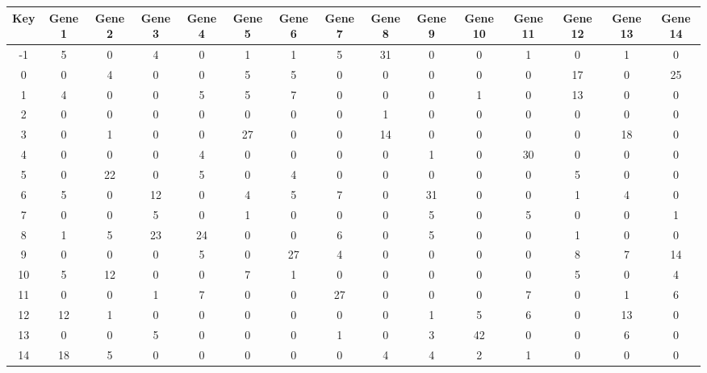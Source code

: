 \begin{tabular}{|c|c|c|c|c|c|c|c|c|c|c|c|c|c|c|}
\hline
Key & Gene 1 & Gene 2 & Gene 3 & Gene 4 & Gene 5 & Gene 6 & Gene 7 & Gene 8 & Gene 9 & Gene 10 & Gene 11 & Gene 12 & Gene 13 & Gene 14 \\
\hline
-1 & 5 & 0 & 4 & 0 & 1 & 1 & 5 & 31 & 0 & 0 & 1 & 0 & 1 & 0 \\
0 & 0 & 4 & 0 & 0 & 5 & 5 & 0 & 0 & 0 & 0 & 0 & 17 & 0 & 25 \\
1 & 4 & 0 & 0 & 5 & 5 & 7 & 0 & 0 & 0 & 1 & 0 & 13 & 0 & 0 \\
2 & 0 & 0 & 0 & 0 & 0 & 0 & 0 & 1 & 0 & 0 & 0 & 0 & 0 & 0 \\
3 & 0 & 1 & 0 & 0 & 27 & 0 & 0 & 14 & 0 & 0 & 0 & 0 & 18 & 0 \\
4 & 0 & 0 & 0 & 4 & 0 & 0 & 0 & 0 & 1 & 0 & 30 & 0 & 0 & 0 \\
5 & 0 & 22 & 0 & 5 & 0 & 4 & 0 & 0 & 0 & 0 & 0 & 5 & 0 & 0 \\
6 & 5 & 0 & 12 & 0 & 4 & 5 & 7 & 0 & 31 & 0 & 0 & 1 & 4 & 0 \\
7 & 0 & 0 & 5 & 0 & 1 & 0 & 0 & 0 & 5 & 0 & 5 & 0 & 0 & 1 \\
8 & 1 & 5 & 23 & 24 & 0 & 0 & 6 & 0 & 5 & 0 & 0 & 1 & 0 & 0 \\
9 & 0 & 0 & 0 & 5 & 0 & 27 & 4 & 0 & 0 & 0 & 0 & 8 & 7 & 14 \\
10 & 5 & 12 & 0 & 0 & 7 & 1 & 0 & 0 & 0 & 0 & 0 & 5 & 0 & 4 \\
11 & 0 & 0 & 1 & 7 & 0 & 0 & 27 & 0 & 0 & 0 & 7 & 0 & 1 & 6 \\
12 & 12 & 1 & 0 & 0 & 0 & 0 & 0 & 0 & 1 & 5 & 6 & 0 & 13 & 0 \\
13 & 0 & 0 & 5 & 0 & 0 & 0 & 1 & 0 & 3 & 42 & 0 & 0 & 6 & 0 \\
14 & 18 & 5 & 0 & 0 & 0 & 0 & 0 & 4 & 4 & 2 & 1 & 0 & 0 & 0 \\
\hline
\end{tabular}